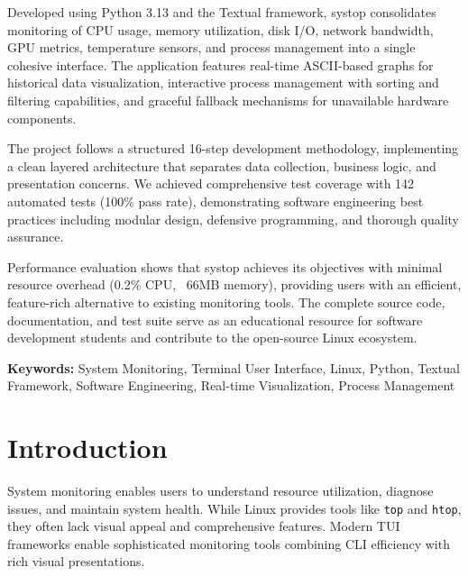 \documentclass[12pt,a4paper,oneside]{report}
\begin{document}
Developed using Python 3.13 and the Textual framework, systop consolidates monitoring of CPU usage, memory utilization, disk I/O, network bandwidth, GPU metrics, temperature sensors, and process management into a single cohesive interface. The application features real-time ASCII-based graphs for historical data visualization, interactive process management with sorting and filtering capabilities, and graceful fallback mechanisms for unavailable hardware components.

The project follows a structured 16-step development methodology, implementing a clean layered architecture that separates data collection, business logic, and presentation concerns. We achieved comprehensive test coverage with 142 automated tests (100\% pass rate), demonstrating software engineering best practices including modular design, defensive programming, and thorough quality assurance.

Performance evaluation shows that systop achieves its objectives with minimal resource overhead (0.2\% CPU, ~66MB memory), providing users with an efficient, feature-rich alternative to existing monitoring tools. The complete source code, documentation, and test suite serve as an educational resource for software development students and contribute to the open-source Linux ecosystem.

\vspace{0.5cm}
\noindent\textbf{Keywords:} System Monitoring, Terminal User Interface, Linux, Python, Textual Framework, Software Engineering, Real-time Visualization, Process Management

\newpage
{}
\listoffigures

\newpage
{}
\listoftables

\newpage

\chapter{Introduction}
\label{chap:introduction}

System monitoring enables users to understand resource utilization, diagnose issues, and maintain system health. While Linux provides tools like \texttt{top} and \texttt{htop}, they often lack visual appeal and comprehensive features. Modern TUI frameworks enable sophisticated monitoring tools combining CLI efficiency with rich visual presentations.
\end{document}
